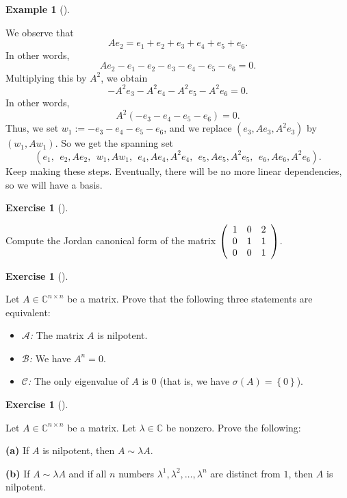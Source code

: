 \documentclass[numbers=enddot,12pt,final,onecolumn,notitlepage]{scrartcl}%
\newcounter{exer}
\numberwithin{exer}{subsection}
\theoremstyle{definition}
\newtheorem{exam}[theo]{Example}
\newenvironment{example}[1][]
{\begin{exam}[#1]\begin{leftbar}}
{\end{leftbar}\end{exam}}
\newtheorem{exmp}[exer]{Exercise}
\newenvironment{exercise}[1][]
{\begin{exmp}[#1]\begin{leftbar}}
{\end{leftbar}\end{exmp}}
\begin{document}
\begin{example}
We observe that%
\[
Ae_{2}=e_{1}+e_{2}+e_{3}+e_{4}+e_{5}+e_{6}.
\]
In other words,%
\[
Ae_{2}-e_{1}-e_{2}-e_{3}-e_{4}-e_{5}-e_{6}=0.
\]
Multiplying this by $A^{2}$, we obtain%
\[
-A^{2}e_{3}-A^{2}e_{4}-A^{2}e_{5}-A^{2}e_{6}=0.
\]
In other words,%
\[
A^{2}\left(  -e_{3}-e_{4}-e_{5}-e_{6}\right)  =0.
\]
Thus, we set $w_{1}:=-e_{3}-e_{4}-e_{5}-e_{6}$, and we replace $\left(
e_{3},Ae_{3},A^{2}e_{3}\right)  $ by $\left(  w_{1},Aw_{1}\right)  $. So we
get the spanning set
\[
\left(  e_{1},\ \ e_{2},Ae_{2},\ \ w_{1},Aw_{1},\ \ e_{4},Ae_{4},A^{2}%
e_{4},\ \ e_{5},Ae_{5},A^{2}e_{5},\ \ e_{6},Ae_{6},A^{2}e_{6}\right)  .
\]
Keep making these steps. Eventually, there will be no more linear
dependencies, so we will have a basis.
\end{example}

\begin{exercise}
 Compute the Jordan canonical form of the matrix $\left(
\begin{array}
[c]{ccc}%
1 & 0 & 2\\
0 & 1 & 1\\
0 & 0 & 1
\end{array}
\right)  $.
\end{exercise}

\begin{exercise}
\label{exe.jnf.step3.An=0} Let $A\in\mathbb{C}^{n\times n}$ be a
matrix. Prove that the following three statements are equivalent:

\begin{itemize}
\item $\mathcal{A}$\textit{:} The matrix $A$ is nilpotent.

\item $\mathcal{B}$\textit{:} We have $A^{n}=0$.

\item $\mathcal{C}$\textit{:} The only eigenvalue of $A$ is $0$ (that is, we
have $\sigma\left(  A\right)  =\left\{  0\right\}  $).
\end{itemize}
\end{exercise}

\begin{exercise}
 Let $A\in\mathbb{C}^{n\times n}$ be a matrix. Let $\lambda
\in\mathbb{C}$ be nonzero. Prove the following: \medskip

\textbf{(a)} If $A$ is nilpotent, then $A\sim\lambda A$. \medskip

\textbf{(b)} If $A\sim\lambda A$ and if all $n$ numbers $\lambda^{1}%
,\lambda^{2},\ldots,\lambda^{n}$ are distinct from $1$, then $A$ is nilpotent.
\end{exercise}
\end{document}
